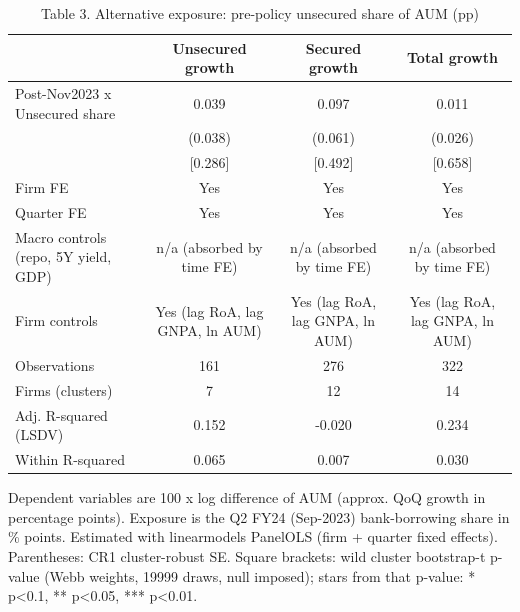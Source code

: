 \begin{table}[htbp]\centering\small
\caption{Table 3. Alternative exposure: pre-policy unsecured share of AUM (pp)}
\begin{tabular}{lccc}
\hline\hline
 & Unsecured growth & Secured growth & Total growth \\
\hline
Post-Nov2023 x Unsecured share & 0.039 & 0.097 & 0.011 \\
 & (0.038) & (0.061) & (0.026) \\
 & [0.286] & [0.492] & [0.658] \\
\hline
Firm FE & Yes & Yes & Yes \\
Quarter FE & Yes & Yes & Yes \\
Macro controls (repo, 5Y yield, GDP) & n/a (absorbed by time FE) & n/a (absorbed by time FE) & n/a (absorbed by time FE) \\
Firm controls & Yes (lag RoA, lag GNPA, ln AUM) & Yes (lag RoA, lag GNPA, ln AUM) & Yes (lag RoA, lag GNPA, ln AUM) \\
Observations & 161 & 276 & 322 \\
Firms (clusters) & 7 & 12 & 14 \\
Adj. R-squared (LSDV) & 0.152 & -0.020 & 0.234 \\
Within R-squared & 0.065 & 0.007 & 0.030 \\
\hline\hline
\end{tabular}
\par\footnotesize Dependent variables are 100 x log difference of AUM (approx. QoQ growth in percentage points). Exposure is the Q2 FY24 (Sep-2023) bank-borrowing share in \% points. Estimated with linearmodels PanelOLS (firm + quarter fixed effects). Parentheses: CR1 cluster-robust SE. Square brackets: wild cluster bootstrap-t p-value (Webb weights, 19999 draws, null imposed); stars from that p-value: * p<0.1, ** p<0.05, *** p<0.01. 
\end{table}